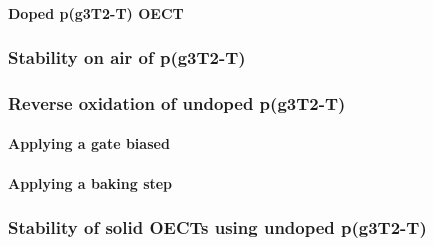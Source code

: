 \paragraph{Doped p(g3T2-T) OECT}


\subsubsection{Stability on air of p(g3T2-T)}

\subsubsection{Reverse oxidation of undoped p(g3T2-T)}

\paragraph{Applying a gate biased}
\paragraph{Applying a baking step}

\subsubsection{Stability of solid OECTs using undoped p(g3T2-T)}


